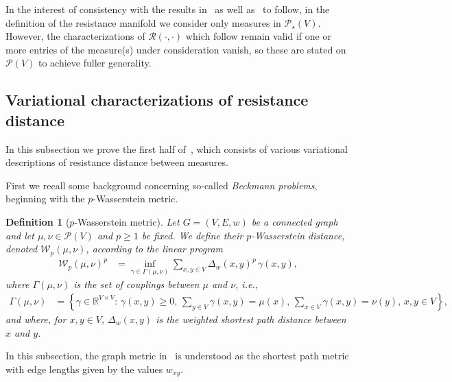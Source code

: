 \documentclass[11pt,a4paper]{article}
\newcommand{\Wass}{\mathcal{W}}
\newcommand{\Resis}{\mathcal{R}}
\newcommand{\Prob}{\mathscr{P}}
\newcommand{\Dist}{\Delta}
\newtheorem{definition}[theorem]{Definition}
\begin{document}
In the interest of consistency with the results in~ as well as~ to follow, in the definition of the resistance manifold we consider only measures in $\Prob_\star(V)$. However, the characterizations of $\Resis(\cdot,\cdot)$ which follow remain valid if one or more entries of the measure(s) under consideration vanish, so these are stated on $\Prob(V)$ to achieve fuller generality.

\subsection{Variational characterizations of resistance distance}\label{subsec:variational-characterizations}

In this subsection we prove the first half of~, which consists of various variational descriptions of resistance distance between measures.

First we recall some background concerning so-called \emph{Beckmann problems}, beginning with the $p$-Wasserstein metric.

\begin{definition}[$p$-Wasserstein metric]\label{defn:wasserstein}
    Let $G=(V, E, w)$ be a connected graph and let $\mu,\nu\in\Prob(V)$ and $p\geq 1$ be fixed. We define their \emph{$p$-Wasserstein distance}, denoted $\Wass_{p}(\mu,\nu)$, according to the linear program
        \begin{align*}
            \Wass_{p}(\mu,\nu)^p &= \inf_{\gamma\in\Gamma(\mu,\nu)} \sum_{x,y\in V} \Dist_{w}(x,y)^p \, \gamma(x,y),
        \end{align*}
    where $\Gamma(\mu,\nu)$ is the set of couplings between $\mu$ and $\nu$, i.e.,
        \begin{align*}
            \Gamma(\mu,\nu) &= \left\{\gamma\in\mathbb{R}^{V\times V}:\, \gamma(x,y)\geq 0,\, \sum_{y\in V} \gamma(x,y) = \mu(x),\, \sum_{x\in V} \gamma(x,y) = \nu(y),\, x,y\in V \right\},
        \end{align*}
    and where, for $x, y\in V$, $\Dist_{w}(x, y)$ is the weighted shortest path distance between $x$ and $y$.
\end{definition}

In this subsection, the graph metric in~ is understood as the shortest path metric with edge lengths given by the values $w_{xy}$.
\end{document}
